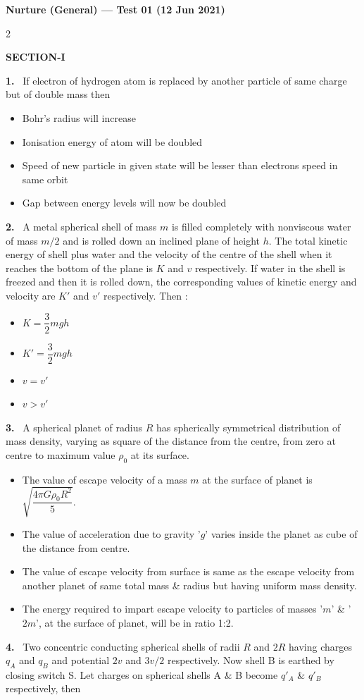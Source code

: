 \documentclass[10pt]{extarticle}
\newcommand{\papersec}[1]{\par\bigskip{\centering\Large\bfseries PAPER-#1\par}\medskip}
\newcommand{\partsec}[2]{\par\medskip\noindent{\large\bfseries PART-#1: #2}\par\smallskip}
\newcommand{\sect}[1]{\par\smallskip\noindent\textbf{#1}\par}
\newcommand{\qn}[1]{\par\smallskip\noindent\textbf{#1.}~}
\newcommand{\paraq}[2]{\par\smallskip\noindent\textbf{Paragraph for Questions #1 and #2}\par}
\newenvironment{qoptions}{\begin{itemize}[leftmargin=1.8em,itemsep=1pt,topsep=2pt,label={}]}{\end{itemize}}
\newcommand{\opt}[2]{\item[(#1)] #2}
\begin{document}
\begin{center}{\Large\bfseries Nurture (General) --- Test 01 (12 Jun 2021)}\end{center}
\begin{multicols}{2}
\raggedcolumns
\renewcommand{\paraq}[2]{\par\smallskip\noindent\textbf{Paragraph for Questions #1 - #2}\par}
\papersec{1}
\partsec{1}{PHYSICS}
\sect{SECTION-I}
\qn{1} If electron of hydrogen atom is replaced by another particle of same charge but of double mass then
\begin{qoptions}
\opt{A}{Bohr's radius will increase}
\opt{B}{Ionisation energy of atom will be doubled}
\opt{C}{Speed of new particle in given state will be lesser than electrons speed in same orbit}
\opt{D}{Gap between energy levels will now be doubled}
\end{qoptions}
\qn{2} A metal spherical shell of mass $m$ is filled completely with nonviscous water of mass $m/2$ and is rolled down an inclined plane of height $h$. The total kinetic energy of shell plus water and the velocity of the centre of the shell when it reaches the bottom of the plane is $K$ and $v$ respectively. If water in the shell is freezed and then it is rolled down, the corresponding values of kinetic energy and velocity are $K'$ and $v'$ respectively. Then :
\begin{qoptions}
\opt{A}{$K=\dfrac32mgh$}
\opt{B}{$K'=\dfrac32mgh$}
\opt{C}{$v=v'$}
\opt{D}{$v>v'$}
\end{qoptions}
\qn{3} A spherical planet of radius $R$ has spherically symmetrical distribution of mass density, varying as square of the distance from the centre, from zero at centre to maximum value $\rho_0$ at its surface.
\begin{qoptions}
\opt{A}{The value of escape velocity of a mass $m$ at the surface of planet is $\sqrt{\dfrac{4\pi G\rho_0R^2}{5}}$.}
\opt{B}{The value of acceleration due to gravity '$g$' varies inside the planet as cube of the distance from centre.}
\opt{C}{The value of escape velocity from surface is same as the escape velocity from another planet of same total mass \& radius but having uniform mass density.}
\opt{D}{The energy required to impart escape velocity to particles of masses '$m$' \& '$2m$', at the surface of planet, will be in ratio 1:2.}
\end{qoptions}
\qn{4} Two concentric conducting spherical shells of radii $R$ and $2R$ having charges $q_A$ and $q_B$ and potential $2v$ and $3v/2$ respectively. Now shell B is earthed by closing switch S. Let charges on spherical shells A \& B become $q'_A$ \& $q'_B$ respectively, then\par

\end{multicols}
\end{document}
